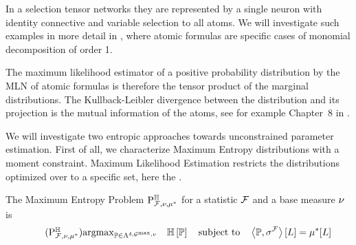 In a selection tensor networks they are represented by a single neuron with identity connective and variable selection to all atoms.
We will investigate such examples in more detail in , where atomic formulas \MarkovLogicNetworks{} are specific cases of monomial decomposition of order 1.

The maximum likelihood estimator of a positive probability distribution by the MLN of atomic formulas is therefore the tensor product of the marginal distributions.
The Kullback-Leibler divergence between the distribution and its projection is the mutual information of the atoms, see for example Chapter~8 in \cite{mackay_information_2003}.

\begin{remark}
\end{remark}





 \label{sec:parameterEstimation} %

We will investigate two entropic approaches towards unconstrained parameter estimation.
First of all, we characterize Maximum Entropy distributions with a moment constraint.
Maximum Likelihood Estimation restricts the distributions optimized over to a specific set, here the \HybridLogicNetworks{}.



The Maximum Entropy Problem $\mathrm{P}^{\mathbb{H}}_{\mathcal{F},\nu,\mu^*}$ for a statistic $\mathcal{F}$ and a base measure $\nu$ is %
\begin{align}
    \label{prob:maxEntropyHLN}\tag{$\probtagtypeinst{\entropysymbol}{\mlnstat,\basemeasure,\genmean}$}
    \argmax_{\probtensor\in\bmrealprobof{\basemeasure}} \quad \sentropyof{\probtensor}
    \quad \text{subject to} \quad
    \contractionof{\probtensor,\sencmlnstat}{\selvariable}
    =  \genmeanwith
\end{align}


